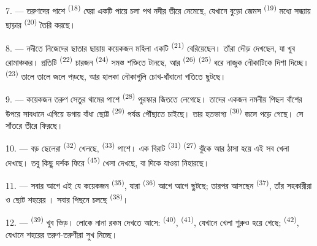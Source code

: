 7. --- তরুণদের পাশে  \textsuperscript{(18)} ঘেরা একটি পায়ে
চলা পথ নদীর তীরে নেমেছে, যেখানে বুড়ো জেমস 
\textsuperscript{(19)} মধ্যে সন্ধ্যায় ছাড়ার 
\textsuperscript{(20)} তৈরি করছে।

\VUsaut{4.4mm}
\VUsaut{3.4mm}

8. --- নদীতে নিজেদের ছাতার ছায়ায় কয়েকজন মহিলা একটি 
\textsuperscript{(21)} বেরিয়েছেন। তাঁরা দৌড় দেখছেন, যা খুব রোমাঞ্চকর। প্রতিটি
 \textsuperscript{(22)} চারজন  \textsuperscript{(24)}
সমস্ত শক্তিতে টানছে, আর  \textsuperscript{(26)}
 \textsuperscript{(25)} ধরে নাজুক নৌকাটিকে দিশা দিচ্ছে।
 \textsuperscript{(23)} তালে তালে জলে পড়ছে, আর হালকা নৌকাগুলি
চোখ-ধাঁধানো গতিতে ছুটছে।

9. --- কয়েকজন তরুণ সেতুর থামের পাশে 
\textsuperscript{(28)} পুরস্কার জিততে লেগেছে। তাদের একজন নমনীয় পিছল বাঁশের উপরে
সাবধানে এগিয়ে ডগায় বাঁধা ছোট্ট  \textsuperscript{(29)} পর্যন্ত
পৌঁছাতে চাইছে। তার হতভাগ্য  \textsuperscript{(30)} জলে
পড়ে গেছে। সে সাঁতরে তীরে ফিরছে।

10. --- বড় ছেলেরা  \textsuperscript{(32)} খেলছে,
 \textsuperscript{(33)} পাশে। এক বিরাট 
\textsuperscript{(31)}  \textsuperscript{(27)}  ঝুঁকে
আর  ঠাসা হয়ে এই সব খেলা দেখছে। তবু কিছু দর্শক ফিরে
 \textsuperscript{(45)} খেলা দেখছে, বা
 দিকে যাওয়া  নিহারছে।

11. --- সবার আগে এই যে কয়েকজন  \textsuperscript{(35)}, যারা
 \textsuperscript{(36)} আগে আগে ছুটছে; তারপর আসছেন
 \textsuperscript{(37)}, তাঁর সহকারীরা ও ছোট শহরের
। সবার পিছনে চলছে  \textsuperscript{(38)}।

\VUsaut{5.0mm}
\VUsaut{3.6mm}

12. ---  \textsuperscript{(39)} খুব ভিড়। লোকে নানা রকম
 দেখতে আসে:  \textsuperscript{(40)},
 \textsuperscript{(41)}, যেখানে খেলা শুরুও হয়ে গেছে;
 \textsuperscript{(42)}, যেখানে শহরের তরুণ-তরুণীরা
 সুখ নিচ্ছে।

